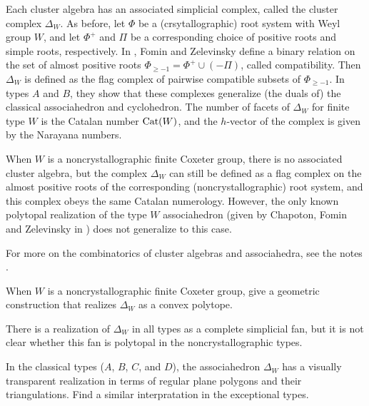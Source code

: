 \documentclass[12pt,letterpaper, reqno]{amsart}
\newcommand{\Cat}{{\rm Cat}}
\begin{document}
Each cluster algebra has an associated simplicial complex, called the {\sf cluster complex} $\Delta_W$. As before, let $\Phi$ be a (crsytallographic) root system with Weyl group $W$, and let $\Phi^+$ and $\Pi$ be a corresponding choice of positive roots and simple roots, respectively. In \cite{fomin-zelevinsky:ysystems}, Fomin and Zelevinsky define a binary relation on the set of almost positive roots $\Phi_{\geq -1}= \Phi^+ \cup (-\Pi)$, called {\sf compatibility}. Then $\Delta_W$ is defined as the flag complex of pairwise compatible subsets of $\Phi_{\geq -1}$. In types $A$ and $B$, they show that these complexes generalize (the duals of) the classical associahedron and cyclohedron. The number of facets of $\Delta_W$ for finite type $W$ is the Catalan number $\Cat(W)$, and the $h$-vector of the complex is given by the Narayana numbers.

When $W$ is a noncrystallographic finite Coxeter group, there is no associated cluster algebra, but the complex $\Delta_W$ can still be defined as a flag complex on the almost positive roots of the corresponding (noncrystallographic) root system, and this complex obeys the same Catalan numerology. However, the only known polytopal realization of the type $W$ associahedron (given by Chapoton, Fomin and Zelevinsky in \cite{chapoton-fomin-zelevinsky}) does not generalize to this case.

For more on the combinatorics of cluster algebras and associahedra, see the notes \cite{fomin-reading:survey}.

\begin{problemblock}
\begin{problem} \label{prob:polytopal} When $W$ is a noncrystallographic finite Coxeter group, give a geometric construction that realizes $\Delta_W$ as a convex polytope. \end{problem}There is a realization of $\Delta_W$ in all types as a complete simplicial fan, but it is not clear whether this fan is polytopal in the noncrystallographic types.

\end{problemblock}

\begin{problem} 
In the classical types ($A$, $B$, $C$, and $D$), the associahedron $\Delta_W$ has a visually transparent realization in terms of regular plane polygons and their triangulations. Find a similar interpratation in the exceptional types.
\end{problem}
\end{document}
